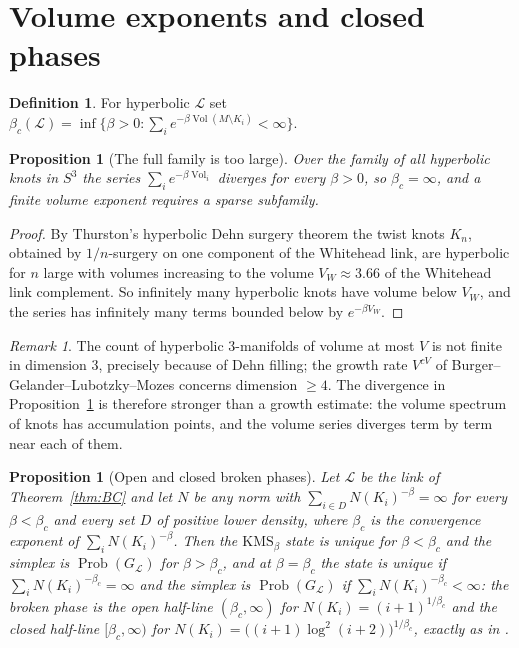 \documentclass[11pt]{amsart}
\numberwithin{equation}{section}
\newtheorem{proposition}[theorem]{Proposition}
\theoremstyle{definition}
\newtheorem{definition}[theorem]{Definition}
\theoremstyle{remark}
\newtheorem{remark}[theorem]{Remark}
\newcommand{\cL}{\mathcal{L}}
\newcommand{\Vol}{\operatorname{Vol}}
\newcommand{\Prob}{\operatorname{Prob}}
\begin{document}
\section{Volume exponents and closed phases}\label{sec:volume}

\begin{definition}\label{def:volexp}
For hyperbolic $\cL$ set
$\beta_c(\cL)=\inf\{\beta>0:\sum_ie^{-\beta\Vol(M\setminus K_i)}<\infty\}$.
\end{definition}

\begin{proposition}[The full family is too large]\label{prop:JT}
Over the family of all hyperbolic knots in $S^3$ the series $\sum_ie^{-\beta\Vol_i}$
diverges for every $\beta>0$, so $\beta_c=\infty$, and a finite volume exponent requires a
sparse subfamily.
\end{proposition}

\begin{proof}
By Thurston's hyperbolic Dehn surgery theorem \cite[Ch.~5]{Thurston} the twist knots $K_n$,
obtained by $1/n$-surgery on one component of the Whitehead link, are hyperbolic for $n$
large with volumes increasing to the volume $V_W\approx3.66$ of the Whitehead link
complement. So infinitely many hyperbolic knots have volume below $V_W$, and the series has
infinitely many terms bounded below by $e^{-\beta V_W}$.
\end{proof}

\begin{remark}
The count of hyperbolic $3$-manifolds of volume at most $V$ is not finite in dimension $3$,
precisely because of Dehn filling; the growth rate $V^{cV}$ of Burger--Gelander--Lubotzky--Mozes
concerns dimension $\ge4$. The divergence in Proposition~\ref{prop:JT} is therefore stronger
than a growth estimate: the volume spectrum of knots has accumulation points, and the volume
series diverges term by term near each of them.
\end{remark}

\begin{proposition}[Open and closed broken phases]\label{prop:closed}
Let $\cL$ be the link of Theorem~\ref{thm:BC} and let $N$ be any norm with
$\sum_{i\in D}N(K_i)^{-\beta}=\infty$ for every $\beta<\beta_c$ and every set $D$ of positive
lower density, where $\beta_c$ is the convergence exponent of $\sum_iN(K_i)^{-\beta}$. Then
the $\mathrm{KMS}_\beta$ state is unique for $\beta<\beta_c$ and the simplex is $\Prob(G_\cL)$
for $\beta>\beta_c$, and at $\beta=\beta_c$ the state is unique if $\sum_iN(K_i)^{-\beta_c}=\infty$
and the simplex is $\Prob(G_\cL)$ if $\sum_iN(K_i)^{-\beta_c}<\infty$: the broken phase is
the open half-line $(\beta_c,\infty)$ for $N(K_i)=(i+1)^{1/\beta_c}$ and the closed half-line
$[\beta_c,\infty)$ for $N(K_i)=\bigl((i+1)\log^2(i+2)\bigr)^{1/\beta_c}$, exactly as in
\cite[Thm.~5.2]{Main}.
\end{proposition}
\end{document}
